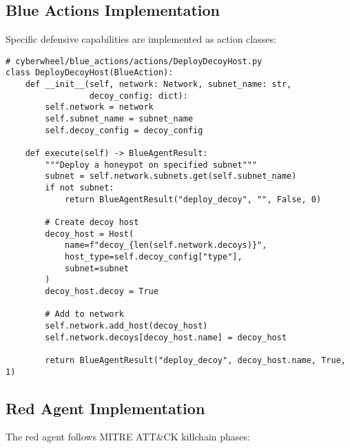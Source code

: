 \documentclass[12pt,a4paper]{article}
\begin{document}
\subsection{Blue Actions Implementation}
Specific defensive capabilities are implemented as action classes:

\begin{lstlisting}[caption=Deploy Decoy Action Implementation]
# cyberwheel/blue_actions/actions/DeployDecoyHost.py
class DeployDecoyHost(BlueAction):
    def __init__(self, network: Network, subnet_name: str, 
                 decoy_config: dict):
        self.network = network
        self.subnet_name = subnet_name
        self.decoy_config = decoy_config
        
    def execute(self) -> BlueAgentResult:
        """Deploy a honeypot on specified subnet"""
        subnet = self.network.subnets.get(self.subnet_name)
        if not subnet:
            return BlueAgentResult("deploy_decoy", "", False, 0)
            
        # Create decoy host
        decoy_host = Host(
            name=f"decoy_{len(self.network.decoys)}",
            host_type=self.decoy_config["type"],
            subnet=subnet
        )
        decoy_host.decoy = True
        
        # Add to network
        self.network.add_host(decoy_host)
        self.network.decoys[decoy_host.name] = decoy_host
        
        return BlueAgentResult("deploy_decoy", decoy_host.name, True, 1)
\end{lstlisting}

\subsection{Red Agent Implementation}
The red agent follows MITRE ATT\&CK killchain phases:
\end{document}
